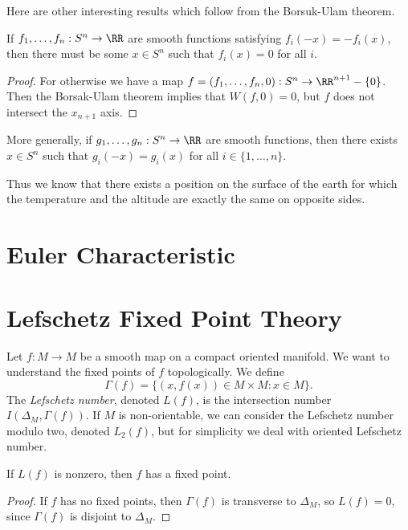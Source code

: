 Here are other interesting results which follow from the Borsuk-Ulam theorem.

\begin{theorem}
    If $f_1, \dots, f_n: S^n \to \RR$ are smooth functions satisfying $f_i(-x) = -f_i(x)$, then there must be some $x \in S^n$ such that $f_i(x) = 0$ for all $i$.
\end{theorem}
\begin{proof}
    For otherwise we have a map $f = (f_1, \dots, f_n,0): S^n \to \RR^{n+1} - \{ 0 \}$. Then the Borsak-Ulam theorem implies that $W(f,0) = 0$, but $f$ does not intersect the $x_{n+1}$ axis.
\end{proof}

\begin{remark}
    More generally, if $g_1, \dots, g_n: S^n \to \RR$ are smooth functions, then there exists $x \in S^n$ such that $g_i(-x) = g_i(x)$ for all $i \in \{ 1, \dots, n \}$.
\end{remark}

Thus we know that there exists a position on the surface of the earth for which the temperature and the altitude are exactly the same on opposite sides.



\section{Euler Characteristic}





\section{Lefschetz Fixed Point Theory}

Let $f: M \to M$ be a smooth map on a compact oriented manifold. We want to understand the fixed points of $f$ topologically. We define
%
\[ \Gamma(f) = \{ (x,f(x)) \in M \times M: x \in M \}. \]
%
The \emph{Lefschetz number}, denoted $L(f)$, is the intersection number $I(\Delta_M, \Gamma(f))$. If $M$ is non-orientable, we can consider the Lefschetz number modulo two, denoted $L_2(f)$, but for simplicity we deal with oriented Lefschetz number.

\begin{lemma}
    If $L(f)$ is nonzero, then $f$ has a fixed point.
\end{lemma}
\begin{proof}
    If $f$ has no fixed points, then $\Gamma(f)$ is transverse to $\Delta_M$, so $L(f) = 0$, since $\Gamma(f)$ is disjoint to $\Delta_M$.
\end{proof}

